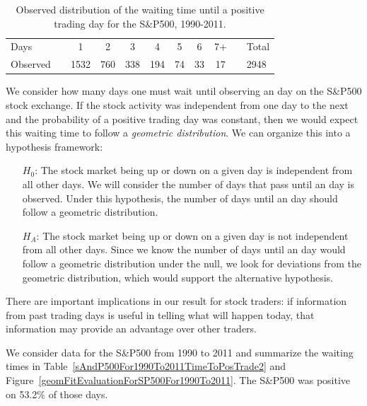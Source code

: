 \begin{table}[h]
\centering
\begin{tabular}{ll ccc ccc c ll}
\hline
Days	 & \hspace{2mm} & 1 & 2 & 3 & 4 & 5 & 6 & 7+ & \hspace{2mm} & Total \\
Observed &		& 1532 & 760 & 338 & 194 & 74 & 33 & 17 & & 2948 \\
\hline
\end{tabular}
\caption{Observed distribution of the waiting time until a positive trading day for the S\&P500, 1990-2011.}
\label{sAndP500For1990To2011TimeToPosTrade}
\end{table}

We consider how many days one must wait until observing an  day on the S\&P500 stock exchange. If the stock activity was independent from one day to the next and the probability of a positive trading day was constant, then we would expect this waiting time to follow a \emph{geometric distribution}. We can organize this into a hypothesis framework:
\begin{itemize}
\item[$H_0$:] The stock market being up or down on a given day is independent from all other days. We will consider the number of days that pass until an  day is observed. Under this hypothesis, the number of days until an  day should follow a geometric distribution.
\item[$H_A$:] The stock market being up or down on a given day is not independent from all other days. Since we know the number of days until an  day would follow a geometric distribution under the null, we look for deviations from the geometric distribution, which would support the alternative hypothesis.
\end{itemize}
There are important implications in our result for stock traders: if information from past trading days is useful in telling what will happen today, that information may provide an advantage over other traders.

We consider data for the S\&P500 from 1990 to 2011 and summarize the waiting times in Table~\ref{sAndP500For1990To2011TimeToPosTrade2} and Figure~\ref{geomFitEvaluationForSP500For1990To2011}. The S\&P500 was positive on 53.2\% of those days.

